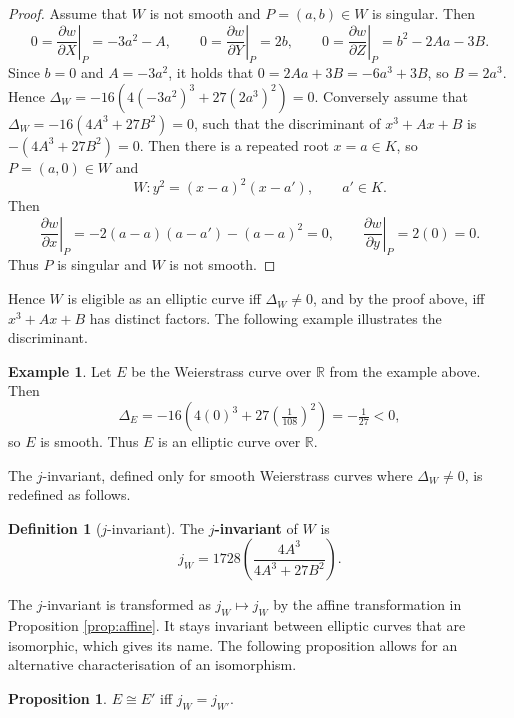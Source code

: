 \documentclass{article}
\newcommand{\R}{\mathbb{R}}
\newcommand{\val}[1]{\left. #1 \right\rvert}
\newcommand{\rb}[1]{\left( #1 \right)}
\theoremstyle{definition}
\newtheorem*{definition}{Definition}
\newtheorem*{example}{Example}
\newtheorem{proposition}{Proposition}[subsection]
\begin{document}
\begin{proof}
Assume that $ W $ is not smooth and $ P = \rb{a, b} \in W $ is singular. Then
$$ 0 = \val{\dfrac{\partial w}{\partial X}}_P = -3a^2 - A, \qquad 0 = \val{\dfrac{\partial w}{\partial Y}}_P = 2b, \qquad 0 = \val{\dfrac{\partial w}{\partial Z}}_P = b^2 - 2Aa - 3B. $$
Since $ b = 0 $ and $ A = -3a^2 $, it holds that $ 0 = 2Aa + 3B = -6a^3 + 3B $, so $ B = 2a^3 $. Hence $ \Delta_W = -16\rb{4\rb{-3a^2}^3 + 27\rb{2a^3}^2} = 0 $. Conversely assume that $ \Delta_W = -16\rb{4A^3 + 27B^2} = 0 $, such that the discriminant of $ x^3 + Ax + B $ is $ -\rb{4A^3 + 27B^2} = 0 $. Then there is a repeated root $ x = a \in K $, so $ P = \rb{a, 0} \in W $ and
$$ W : y^2 = \rb{x - a}^2\rb{x - a'}, \qquad a' \in K. $$
Then
$$ \val{\dfrac{\partial w}{\partial x}}_P = -2\rb{a - a}\rb{a - a'} - \rb{a - a}^2 = 0, \qquad \val{\dfrac{\partial w}{\partial y}}_P = 2\rb{0} = 0. $$
Thus $ P $ is singular and $ W $ is not smooth.
\end{proof}

Hence $ W $ is eligible as an elliptic curve iff $ \Delta_W \ne 0 $, and by the proof above, iff $ x^3 + Ax + B $ has distinct factors. The following example illustrates the discriminant.

\begin{example}
Let $ E $ be the Weierstrass curve over $ \R $ from the example above. Then
$$ \Delta_E = -16\rb{4\rb{0}^3 + 27\rb{\tfrac{1}{108}}^2} = -\tfrac{1}{27} < 0, $$
so $ E $ is smooth. Thus $ E $ is an elliptic curve over $ \R $.
\end{example}

The $ j $-invariant, defined only for smooth Weierstrass curves where $ \Delta_W \ne 0 $, is redefined as follows.

\begin{definition}[$ j $-invariant]
The \textbf{$ j $-invariant} of $ W $ is
$$ j_W = 1728\rb{\dfrac{4A^3}{4A^3 + 27B^2}}. $$
\end{definition}

The $ j $-invariant is transformed as $ j_W \mapsto j_W $ by the affine transformation in Proposition \ref{prop:affine}. It stays invariant between elliptic curves that are isomorphic, which gives its name. The following proposition allows for an alternative characterisation of an isomorphism.

\begin{proposition}
$ E \cong E' $ iff $ j_W = j_{W'} $.
\end{proposition}
\end{document}
